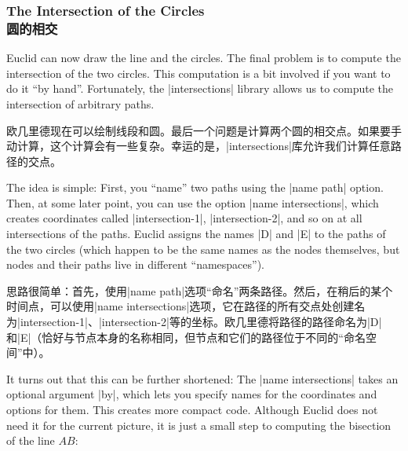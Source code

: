 \begin{paracol}{2}
\subsubsection{The Intersection of the Circles\\圆的相交}

Euclid can now draw the line and the circles. The final problem is to compute
the intersection of the two circles. This computation is a bit involved if you
want to do it ``by hand''. Fortunately, the |intersections| library allows us
to compute the intersection of arbitrary paths.

欧几里德现在可以绘制线段和圆。最后一个问题是计算两个圆的相交点。如果要手动计算，这个计算会有一些复杂。幸运的是，|intersections|库允许我们计算任意路径的交点。

The idea is simple: First, you ``name'' two paths using the |name path| option.
Then, at some later point, you can use the option |name intersections|, which
creates coordinates called |intersection-1|, |intersection-2|, and so on at all
intersections of the paths. Euclid assigns the names |D| and |E| to the paths
of the two circles (which happen to be the same names as the nodes themselves,
but nodes and their paths live in different ``namespaces'').
%

思路很简单：首先，使用|name path|选项“命名”两条路径。然后，在稍后的某个时间点，可以使用|name intersections|选项，它在路径的所有交点处创建名为|intersection-1|、|intersection-2|等的坐标。欧几里德将路径的路径命名为|D|和|E|（恰好与节点本身的名称相同，但节点和它们的路径位于不同的“命名空间”中）。
\begin{codeexample}[preamble={\usetikzlibrary{intersections,through}}]
\end{codeexample}

It turns out that this can be further shortened: The |name intersections| takes
an optional argument |by|, which lets you specify names for the coordinates and
options for them. This creates more compact code. Although Euclid does not need
it for the current picture, it is just a small step to computing the bisection
of the line $AB$:
%


\end{paracol}
